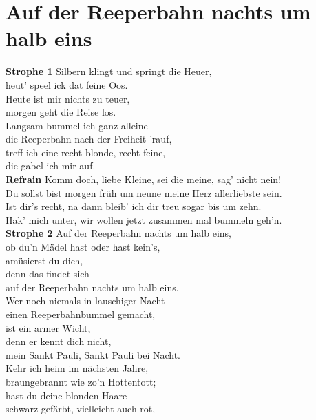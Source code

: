 \documentclass[twoside,8pt]{scrartcl}
\begin{document}
\section{Auf der Reeperbahn nachts um halb eins}
\textbf{Strophe 1}\newline
Silbern klingt und springt die Heuer,\\
heut' speel ick dat feine Oos.\\
Heute ist mir nichts zu teuer,\\
morgen geht die Reise los.\\
Langsam bummel ich ganz alleine\\
die Reeperbahn nach der Freiheit 'rauf,\\
treff ich eine recht blonde, recht feine,\\
die gabel ich mir auf.\\
\newline
\textbf{Refrain}\newline
Komm doch, liebe Kleine, sei die meine, sag' nicht nein!\\
Du sollst bist morgen früh um neune meine Herz allerliebste sein.\\
Ist dir's recht, na dann bleib' ich dir treu sogar bis um zehn.\\
Hak' mich unter, wir wollen jetzt zusammen mal bummeln geh'n.\\
\newline
\textbf{Strophe 2}\newline
Auf der Reeperbahn nachts um halb eins,\\
ob du'n Mädel hast oder hast kein's,\\
amüsierst du dich,\\
denn das findet sich\\
auf der Reeperbahn nachts um halb eins.\\
Wer noch niemals in lauschiger Nacht\\
einen Reeperbahnbummel gemacht,\\
ist ein armer Wicht,\\
denn er kennt dich nicht,\\
mein Sankt Pauli, Sankt Pauli bei Nacht.\\
\newline
Kehr ich heim im nächsten Jahre,\\
braungebrannt wie zo'n Hottentott;\\
hast du deine blonden Haare\\
schwarz gefärbt, vielleicht auch rot,\\
\end{document}
